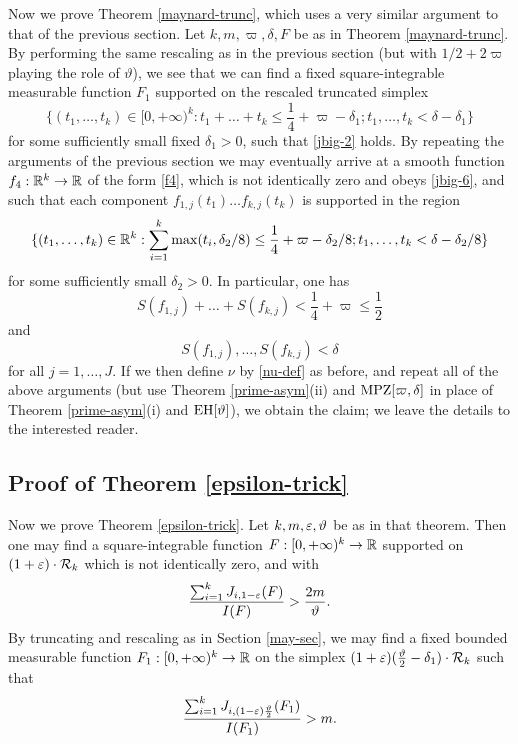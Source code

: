 Now we prove Theorem \ref{maynard-trunc}, which uses a very similar argument to that of the previous section.  Let $k, m, \varpi, \delta, F$ be as in Theorem \ref{maynard-trunc}.  By performing the same rescaling as in the previous section (but with $1/2 + 2\varpi$ playing the role of $\vartheta$), we see that we can find
a fixed square-integrable measurable function $F_1$ supported on the rescaled truncated simplex
$$ \{ (t_1,\dots,t_k) \in [0,+\infty)^k: t_1+\dots+t_k \leq \frac{1}{4} + \varpi - \delta_1; t_1,\dots,t_k < \delta - \delta_1 \}$$
for some sufficiently small fixed $\delta_1>0$, such that \eqref{jbig-2} holds.  By repeating the arguments of the previous section we may eventually arrive at a smooth function $f_4: \mathbb{R}^k \to \mathbb{R}$ of the form \eqref{f4}, which is not identically zero and obeys \eqref{jbig-6}, and such that each component $f_{1,j}(t_1) \dots f_{k,j}(t_k)$ is supported in the region
$$ \{ (t_1,\dots,t_k) \in \mathbb{R}^k: \sum_{i=1}^k \max(t_i, \delta_2/8) \leq \frac{1}{4}+\varpi - \delta_2/8; t_1,\dots,t_k < \delta - \delta_2/8 \}$$
for some sufficiently small $\delta_2>0$.  In particular, one has
$$
S(f_{1,j}) + \dots + S(f_{k,j}) < \frac{1}{4}+\varpi \leq \frac{1}{2}$$
and
$$ S(f_{1,j}),\dots,S(f_{k,j}) < \delta$$
for all $j=1,\dots,J$.   If we then define $\nu$ by \eqref{nu-def} as before, and repeat all of the above arguments (but use Theorem \ref{prime-asym}(ii) and $\operatorname*{MPZ}[\varpi,\delta]$ in place of Theorem \ref{prime-asym}(i) and $\operatorname*{EH}[\vartheta]$), we obtain the claim; we leave the details to the interested reader.

\subsection{Proof of Theorem \ref{epsilon-trick}}\label{trick-sec}

Now we prove Theorem \ref{epsilon-trick}. Let $k, m, \varepsilon, \vartheta$ be as in that theorem.  Then one may find a square-integrable function $F: [0,+\infty)^k \to \mathbb{R}$ supported on $(1+\varepsilon) \cdot {\mathcal R}_k$ which is not identically zero, and with
$$\frac{\sum_{i=1}^k J_{i,1-\varepsilon}(F)}{I(F)} > \frac{2m}{\vartheta}.$$
By truncating and rescaling as in Section \ref{may-sec}, we may find a fixed bounded measurable function $F_1: [0,+\infty)^k \to \mathbb{R}$ on the simplex $(1+\varepsilon) (\frac{\vartheta}{2}-\delta_1) \cdot {\mathcal R}_k$ such that 
$$\frac{\sum_{i=1}^k J_{i,(1-\varepsilon) \frac{\vartheta}{2}}(F_1)}{I(F_1)} > m.$$

